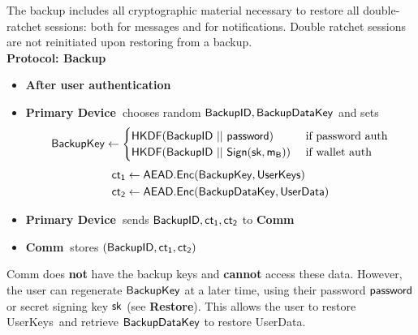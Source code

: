 \documentclass{article}
\newcommand{\sk}{{\sf sk}}
\newcommand{\pw}{{\sf password}}
\newcommand{\bk}{{\sf BackupKey}}
\newcommand{\bkdata}{{\sf BackupDataKey}}
\newcommand{\bid}{\sf BackupID}
\newcommand{\hkdf}{\sf HKDF}
\newcommand{\sign}{\sf Sign}
\newcommand{\aesenc}{\sf AEAD.Enc}
\newcommand{\ct}{\sf ct}
\newcommand{\userdata}{{\sf UserData}}
\newcommand{\userkeys}{{\sf UserKeys}}
\newcommand{\pdevice}{{\bf \color{red} Primary Device~}}
\newcommand{\comm}{{\bf \color{blue} Comm~}}
\newcommand{\afterauth}{{\bf \color{teal} After user authentication~}}
\begin{document}
The backup includes all cryptographic material necessary to restore all double-ratchet sessions: both for messages and for notifications. Double ratchet sessions are not reinitiated upon restoring from a backup.\\


\noindent \textbf{Protocol: Backup}
\begin{itemize}
    \item \afterauth
    \item \pdevice chooses random $\bid, \bkdata$ and sets
    \[ \bk \gets \begin{cases} 
      \hkdf(\bid~||~\pw) & \text{ if password auth} \\
      \hkdf(\bid~||~\sign(\sk, m_B)) & \text{ if wallet auth} \end{cases} \]
    \begin{align*}
      \ct_1 &\gets \aesenc(\bk, \userkeys)\\
      \ct_2 &\gets \aesenc(\bkdata, \userdata)
    \end{align*}
    
   \item \pdevice sends $\bid, \ct_1, \ct_2$ to \comm
   \item \comm stores $(\bid, \ct_1, \ct_2)$
\end{itemize}

\noindent Comm does \textbf{not} have the backup keys and \textbf{cannot} access these data. However, the user can regenerate $\bk$ at a later time, using their password $\pw$ or secret signing key $\sk$ (see {\bf Restore}). This allows the user to restore \userkeys~and retrieve $\bkdata$ to restore \userdata.\\
\end{document}
